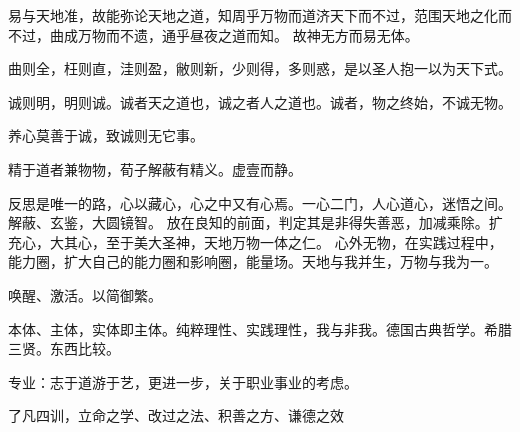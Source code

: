易与天地准，故能弥论天地之道，知周乎万物而道济天下而不过，范围天地之化而不过，曲成万物而不遗，通乎昼夜之道而知。
故神无方而易无体。

曲则全，枉则直，洼则盈，敝则新，少则得，多则惑，是以圣人抱一以为天下式。

诚则明，明则诚。诚者天之道也，诚之者人之道也。诚者，物之终始，不诚无物。

养心莫善于诚，致诚则无它事。

精于道者兼物物，荀子解蔽有精义。虚壹而静。

反思是唯一的路，心以藏心，心之中又有心焉。一心二门，人心道心，迷悟之间。解蔽、玄鉴，大圆镜智。
放在良知的前面，判定其是非得失善恶，加减乘除。扩充心，大其心，至于美大圣神，天地万物一体之仁。
心外无物，在实践过程中，能力圈，扩大自己的能力圈和影响圈，能量场。天地与我并生，万物与我为一。

唤醒、激活。以简御繁。

本体、主体，实体即主体。纯粹理性、实践理性，我与非我。德国古典哲学。希腊三贤。东西比较。

专业：志于道游于艺，更进一步，关于职业事业的考虑。

了凡四训，立命之学、改过之法、积善之方、谦德之效
